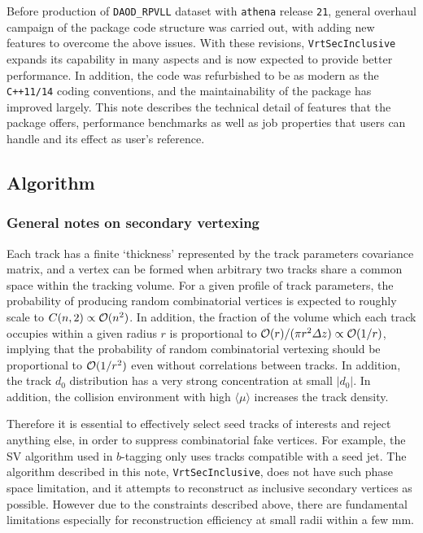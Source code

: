 Before production of {\tt DAOD\_RPVLL} dataset with {\tt athena} release {\tt 21}, general overhaul campaign of the package code structure was carried out, with adding new features to overcome the above issues. With these revisions, {\tt VrtSecInclusive} expands its capability in many aspects and is now expected to provide better performance. In addition, the code was refurbished to be as modern as the {\tt C++11/14} coding conventions, and the maintainability of the package has improved largely. This note describes the technical detail of features that the package offers, performance benchmarks as well as job properties that users can handle and its effect as user's reference.

\subsection{Algorithm}
\label{sec:structure}

\subsubsection{General notes on secondary vertexing}
Each track has a finite `thickness' represented by the track parameters covariance matrix, and a vertex can be formed when arbitrary two tracks share a common space within the tracking volume. For a given profile of track parameters, the probability of producing random combinatorial vertices is expected to roughly scale to $C(n,2)\propto {\cal O}(n^{2})$. In addition, the fraction of the volume which each track occupies within a given radius $r$ is proportional to ${\cal O}(r)/(\pi r^{2}\varDelta z)\propto {\cal O}(1/r)$, implying that the probability of random combinatorial vertexing should be proportional to ${\cal O}(1/r^{2})$ even without correlations between tracks. In addition, the track $d_{0}$ distribution has a very strong concentration at small $|d_{0}|$. In addition, the collision environment with high $\langle\mu\rangle$ increases the track density.

Therefore it is essential to effectively select seed tracks of interests and reject anything else, in order to suppress combinatorial fake vertices. For example, the SV algorithm used in $b$-tagging only uses tracks compatible with a seed jet. The algorithm described in this note, {\tt VrtSecInclusive}, does not have such phase space limitation, and it attempts to reconstruct as inclusive secondary vertices as possible. However due to the constraints described above, there are fundamental limitations especially for reconstruction efficiency at small radii within a few mm.

